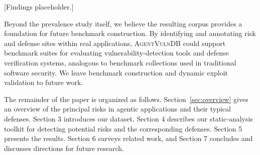 [Findings placeholder.]

Beyond the prevalence study itself, we believe the resulting corpus provides a foundation for future benchmark construction. By identifying and annotating risk and defense sites within real applications, \textsc{AgentVulnDB} could support benchmark suites for evaluating vulnerability-detection tools and defense verification systems, analogous to benchmark collections used in traditional software security. We leave benchmark construction and dynamic exploit validation to future work.

The remainder of the paper is organized as follows. Section~\ref{sec:overview} gives an overview of the principal risks in agentic applications and their typical defenses. Section 3 introduces our dataset. Section 4 describes our static-analysis toolkit for detecting potential risks and the corresponding defenses. Section 5 presents the results. Section 6 surveys related work, and Section 7 concludes and discusses directions for future research.